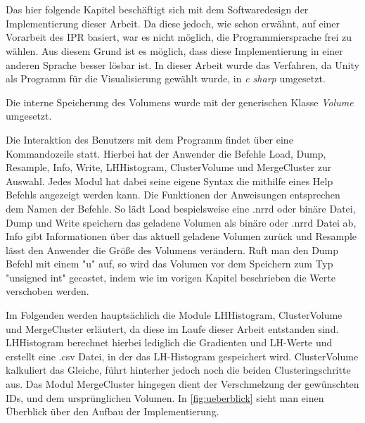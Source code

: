 \chapter{}
\label{sec:concept}



Das hier folgende Kapitel beschäftigt sich mit dem Softwaredesign der Implementierung dieser Arbeit. Da diese jedoch, wie schon erwähnt, auf einer Vorarbeit des IPR basiert, war es nicht möglich, die Programmiersprache frei zu wählen. Aus diesem Grund ist es möglich, dass diese Implementierung in einer anderen Sprache besser lösbar ist. In dieser Arbeit wurde das Verfahren, da Unity als Programm für die Visualisierung gewählt wurde, in \textit{c sharp} umgesetzt. 

Die interne Speicherung des Volumens wurde mit der generischen Klasse \textit{Volume} umgesetzt. 

Die Interaktion des Benutzers mit dem Programm findet über eine Kommandozeile statt. Hierbei hat der Anwender die Befehle Load, Dump, Resample, Info, Write, LHHistogram, ClusterVolume und MergeCluster zur Auswahl. Jedes Modul hat dabei seine eigene Syntax die mithilfe eines Help Befehls angezeigt werden kann.
Die Funktionen der Anweisungen entsprechen dem Namen der Befehle. So lädt Load bespielsweise eine .nrrd oder binäre Datei, Dump und Write speichern das geladene Volumen als binäre oder .nrrd Datei ab, Info gibt Informationen über das aktuell geladene Volumen zurück und Resample lässt den Anwender die Größe des Volumens verändern. Ruft man den Dump Befehl mit einem "u" auf, so wird das Volumen vor dem Speichern zum Typ "unsigned int" gecastet, indem wie im vorigen Kapitel beschrieben die Werte verschoben werden.


Im Folgenden werden hauptsächlich die Module LHHistogram, ClusterVolume und MergeCluster erläutert, da diese im Laufe dieser Arbeit entstanden sind. LHHistogram berechnet hierbei lediglich die Gradienten und LH-Werte und erstellt eine .csv Datei, in der das LH-Histogram gespeichert wird. ClusterVolume kalkuliert das Gleiche, führt hinterher jedoch noch die beiden Clusteringschritte aus. Das Modul MergeCluster hingegen dient der Verschmelzung der gewünschten IDs, und dem ursprünglichen Volumen. In \autoref{fig:ueberblick} sieht man einen Überblick über den Aufbau der Implementierung.

